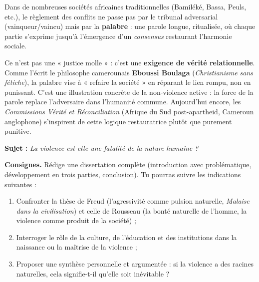 \documentclass[11pt]{article}
\newcommand{\cle}[1]{{\popxbold\color{popdark}#1}}
\newcounter{popsec}
\newcounter{popsub}
\newcommand{\courssub}[1]{%
  \stepcounter{popsub}%
  \par\vspace{9pt}\noindent{\popxbold\fontsize{11.5}{13}\selectfont\color{popink}{\color{poporange}\thepopsec.\thepopsub}\hspace{6pt}#1}\par\nopagebreak\vspace{4pt}
}
\begin{document}
\begin{savaistu}
Dans de nombreuses sociétés africaines traditionnelles (Bamiléké, Bassa, Peuls, etc.), le règlement des conflits ne passe pas par le tribunal adversarial (vainqueur/vaincu) mais par la \textbf{palabre} : une parole longue, ritualisée, où chaque partie s'exprime jusqu'à l'émergence d'un \emph{consensus} restaurant l'harmonie sociale. 

\medskip
\noindent Ce n'est pas une « justice molle » : c'est une \textbf{exigence de vérité relationnelle}. Comme l'écrit le philosophe camerounais \textbf{Eboussi Boulaga} (\emph{Christianisme sans fétiche}), la palabre vise à « \guillemotleft refaire la société \guillemotright » en réparant le lien rompu, non en punissant. C'est une illustration concrète de la \cle{non-violence active} : la force de la parole replace l'adversaire dans l'humanité commune. Aujourd'hui encore, les \emph{Commissions Vérité et Réconciliation} (Afrique du Sud post-apartheid, Cameroun anglophone) s'inspirent de cette logique restauratrice plutôt que purement punitive.
\end{savaistu}

\courssub{Je me prépare au Bac}

\begin{exercice}
\textbf{Sujet :} \emph{La violence est-elle une fatalité de la nature humaine ?}

\textbf{Consignes.} Rédige une dissertation complète (introduction avec problématique, développement en trois parties, conclusion). Tu pourras suivre les indications suivantes :
\begin{enumerate}
\item Confronter la thèse de Freud (l'agressivité comme pulsion naturelle, \emph{Malaise dans la civilisation}) et celle de Rousseau (la bonté naturelle de l'homme, la violence comme produit de la société) ;
\item Interroger le rôle de la culture, de l'éducation et des institutions dans la naissance ou la maîtrise de la violence ;
\item Proposer une synthèse personnelle et argumentée : si la violence a des racines naturelles, cela signifie-t-il qu'elle soit inévitable ?
\end{enumerate}
\end{exercice}
\end{document}
